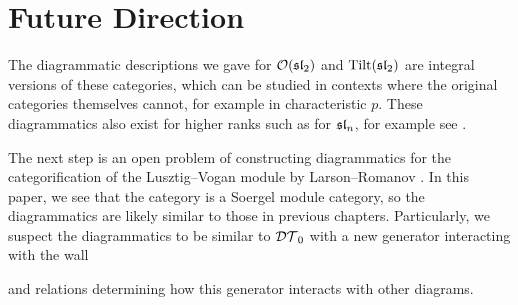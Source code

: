 \chapter{Future Direction}
\label{chapter:future-direction}

The diagrammatic descriptions we gave for $\mathcal{O}(\operatorname{\mathfrak{sl}}_2)$ and $\operatorname{Tilt}(\operatorname{\mathfrak{sl}}_2)$ are integral versions of these categories, which can be studied in contexts where the original categories themselves cannot, for example in characteristic $p$. These diagrammatics also exist for higher ranks such as for $\operatorname{\mathfrak{sl}}_n$, for example see \cite{riche-williamson-tilt-modules-p-canon-basis}.

The next step is an open problem of constructing diagrammatics for the categorification of the Lusztig--Vogan module by Larson--Romanov \cite{categorification-lusztig-vogan-module}. In this paper, we see that the category is a Soergel module category, so the diagrammatics are likely similar to those in previous chapters. Particularly, we suspect the diagrammatics to be similar to $\mathcal{DT}_0$ with a new generator interacting with the wall
\begin{center}
\end{center}
and relations determining how this generator interacts with other diagrams.

